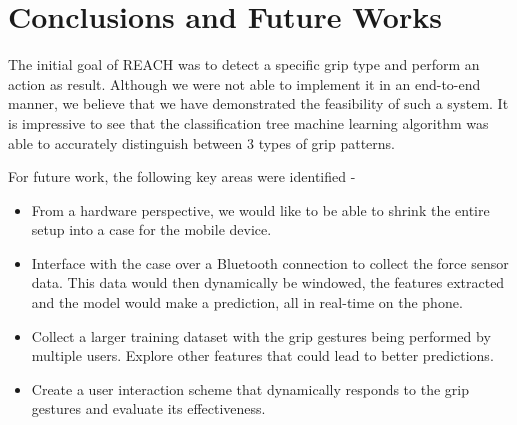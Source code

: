 \section{Conclusions and Future Works}

The initial goal of REACH was to detect a specific grip type and perform an action as result. Although we were not able to implement it in an end-to-end manner, we believe that we have demonstrated the feasibility of such a system. It is impressive to see that the classification tree machine learning algorithm was able to accurately distinguish between 3 types of grip patterns.

\par
For future work, the following key areas were identified - 
\begin{itemize}
  \item From a hardware perspective, we would like to be able to shrink the entire setup into a case for the mobile device.
  
  \item Interface with the case over a Bluetooth connection to collect the force sensor data. This data would then dynamically be windowed, the features extracted and the model would make a prediction, all in real-time on the phone.
  
  \item Collect a larger training dataset with the grip gestures being performed by multiple users. Explore other features that could lead to better predictions.
  
  \item Create a user interaction scheme that dynamically responds to the grip gestures and evaluate its effectiveness.

\end{itemize}